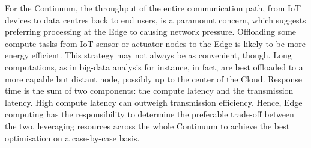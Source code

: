 
For the Continuum, the throughput of the entire communication path, from IoT devices to data centres back to end users, is a paramount concern, which suggests preferring processing at the Edge to causing network pressure. 
Offloading some compute tasks from IoT sensor or actuator nodes to the Edge is likely to be more energy efficient. 
This strategy may not always be as convenient, though. Long computations, as in big-data analysis for instance, in fact, are best offloaded to a more capable but distant node, possibly up to the center of the Cloud. 
Response time is the sum of two components: the compute latency and the transmission latency. High compute latency can outweigh transmission efficiency. 
Hence, Edge computing has the responsibility to determine the preferable trade-off between the two, leveraging resources across the whole Continuum to achieve the best optimisation on a case-by-case basis.

